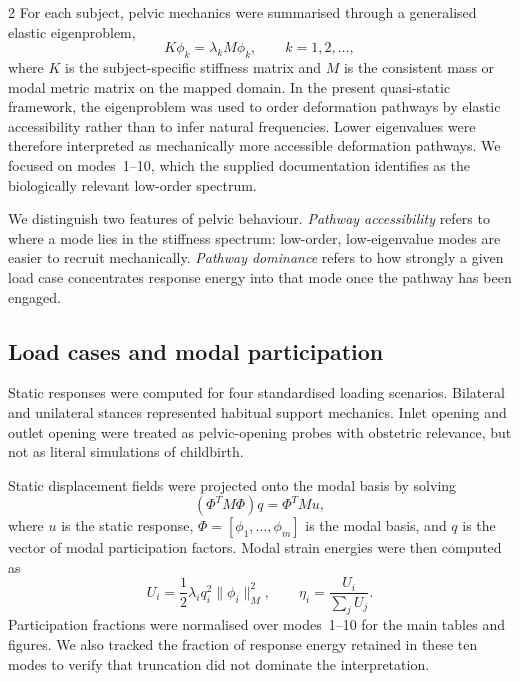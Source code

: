 \documentclass[openacc]{rsproca_new}
\begin{document}
\begin{multicols}{2}
For each subject, pelvic mechanics were summarised through a generalised elastic eigenproblem,
\begin{equation}
K\phi_{k} = \lambda_{k} M\phi_{k}, \qquad k=1,2,\ldots,
\end{equation}
where $K$ is the subject-specific stiffness matrix and $M$ is the consistent mass or modal metric matrix on the mapped domain. In the present quasi-static framework, the eigenproblem was used to order deformation pathways by elastic accessibility rather than to infer natural frequencies. Lower eigenvalues were therefore interpreted as mechanically more accessible deformation pathways. We focused on modes~1--10, which the supplied documentation identifies as the biologically relevant low-order spectrum.


We distinguish two features of pelvic behaviour. \emph{Pathway accessibility} refers to where a mode lies in the stiffness spectrum: low-order, low-eigenvalue modes are easier to recruit mechanically. \emph{Pathway dominance} refers to how strongly a given load case concentrates response energy into that mode once the pathway has been engaged.

\subsection{Load cases and modal participation}





Static responses were computed for four standardised loading scenarios. Bilateral and unilateral stances represented habitual support mechanics. Inlet opening and outlet opening were treated as pelvic-opening probes with obstetric relevance, but not as literal simulations of childbirth.

Static displacement fields were projected onto the modal basis by solving
\begin{equation}
(\Phi^{T}M\Phi)q = \Phi^{T}Mu,
\end{equation}
where $u$ is the static response, $\Phi=[\phi_{1},\ldots,\phi_{m}]$ is the modal basis, and $q$ is the vector of modal participation factors. Modal strain energies were then computed as
\begin{equation}
U_{i}=\frac{1}{2}\lambda_{i}q_{i}^{2}\lVert\phi_{i}\rVert_{M}^{2}, \qquad
\eta_{i}=\frac{U_{i}}{\sum_{j}U_{j}}.
\end{equation}
Participation fractions were normalised over modes~1--10 for the main tables and figures. We also tracked the fraction of response energy retained in these ten modes to verify that truncation did not dominate the interpretation.




\end{multicols}
\end{document}
